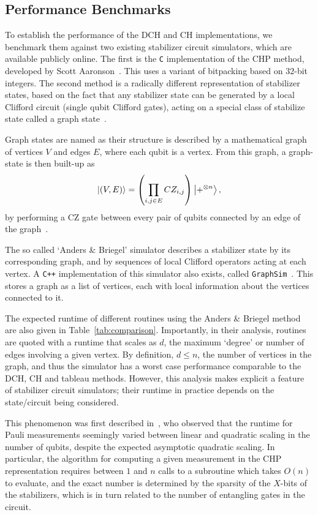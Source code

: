 \subsection{Performance Benchmarks}
To establish the performance of the DCH and CH implementations, we benchmark them against two existing stabilizer circuit simulators, which are available publicly online. The first is the \texttt{C} implementation of the CHP method, developed by Scott Aaronson~\cite{Aaronson2004b}. This uses a variant of bitpacking based on $32$-bit integers. The second method is a radically different representation of stabilizer states, based on the fact that any stabilizer state can be generated by a local Clifford circuit (single qubit Clifford gates), acting on a special class of stabilize state called a graph state~\cite{Schlingemann2001,VandenNest2004}.\par
Graph states are named as their structure is described by a mathematical graph of vertices $V$ and edges $E$, where each qubit is a vertex. From this graph, a graph-state is then built-up as
\[\ket{(V,E)} = \left(\prod_{i,j \in E}CZ_{i,j}\right)\ket{+^{\otimes n}},\]
by performing a CZ gate between every pair of qubits connected by an edge of the graph~\cite{VandenNest2004}.\par
The so called `Anders \& Briegel' simulator describes a stabilizer state by its corresponding graph, and by sequences of local Clifford operators acting at each vertex. A \texttt{C++} implementation of this simulator also exists, called \texttt{GraphSim}~\cite{Anders2006b}. This stores a graph as a list of vertices, each with local information about the vertices connected to it.\par
The expected runtime of different routines using the Anders \& Briegel method are also given in Table~\ref{tab:comparison}. Importantly, in their analysis, routines are quoted with a runtime that scales as $d$, the maximum `degree' or number of edges involving a given vertex. By definition, $d\leq n$, the number of vertices in the graph, and thus the simulator has a worst case performance comparable to the DCH, CH and tableau methods. However, this analysis makes explicit a feature of stabilizer circuit simulators; their runtime in practice depends on the state/circuit being considered.\par
This phenomenon was first described in~\cite{Aaronson2004}, who observed that the runtime for Pauli measurements seemingly varied between linear and quadratic scaling in the number of qubits, despite the expected asymptotic quadratic scaling. In particular, the algorithm for computing a given measurement in the CHP representation requires between $1$ and $n$ calls to a subroutine which takes $O(n)$ to evaluate, and the exact number is determined by the sparsity of the $X$-bits of the stabilizers, which is in turn related to the number of entangling gates in the circuit.\par
